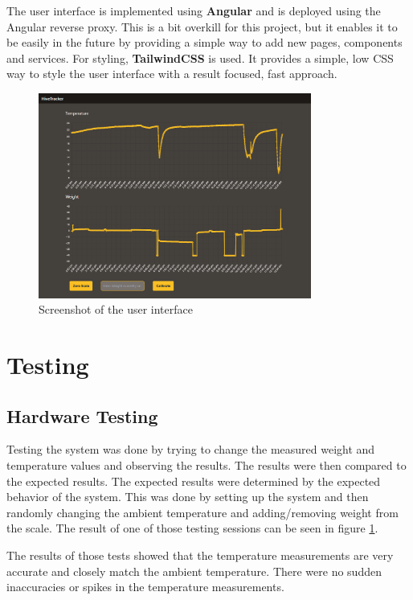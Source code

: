 The user interface is implemented using \textbf{Angular} and is deployed using the Angular reverse proxy. This is a bit overkill for this project, but it enables it to be easily in the future by providing a simple way to add new pages, components and services. For styling, \textbf{TailwindCSS} is used. It provides a simple, low CSS way to style the user interface with a result focused, fast approach.

\begin{figure}
    \centering
    \includegraphics[width=0.8\textwidth]{figures/user_interface.png}
    \caption{Screenshot of the user interface}
    \label{fig:user_interface}
\end{figure}

\newpage
\section{Testing}
\subsection{Hardware Testing}
Testing the system was done by trying to change the measured weight and temperature values and observing the results. The results were then compared to the expected results. The expected results were determined by the expected behavior of the system. This was done by setting up the system and then randomly changing the ambient temperature and adding/removing weight from the scale. The result of one of those testing sessions can be seen in figure \ref{fig:user_interface}.

The results of those tests showed that the temperature measurements are very accurate and closely match the ambient temperature. There were no sudden inaccuracies or spikes in the temperature measurements. 

